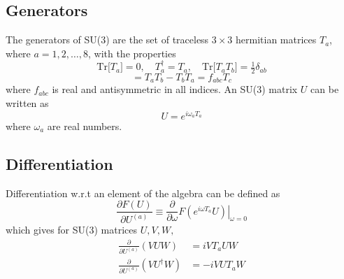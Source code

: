 \documentclass[a4paper,12pt]{article}
\newcommand{\tr}[1]{\text{Tr}\big[#1\big]}
\begin{document}
\subsection{Generators}
The generators of SU(3) are the set of traceless $3\times 3$ hermitian matrices $T_a$, where $a=1,2,\ldots,8$, with the properties
\begin{equation}
\tr{T_a}=0, \quad T_a^{\dagger}=T_a, \quad \tr{T_a T_b} = \tfrac{1}{2}\delta_{ab}
\end{equation}
\begin{equation}
[T_a,T_b] = T_a T_b - T_b T_a = f_{abc} T_c
\end{equation}
where $f_{abc}$ is real and antisymmetric in all indices. An SU(3) matrix $U$ can be written as
\begin{equation}
U = e^{i \omega_a T_a}
\end{equation}
where $\omega_a$ are real numbers.

\subsection{Differentiation}
Differentiation w.r.t an element of the algebra can be defined as
\begin{equation}
\frac{\partial F(U)}{\partial U^{(a)}} \equiv \frac{\partial}{\partial \omega} \left. F(e^{i \omega T_a} U) \right|_{\omega=0}
\end{equation}
which gives for SU(3) matrices $U, V, W,$
\begin{align}
\frac{\partial}{\partial U^{(a)}} \left( V U W \right) &= i V T_a U W \\
\frac{\partial}{\partial U^{(a)}} \left( V U^{\dagger} W \right) &= -i V U T_a W
\end{align}
\end{document}
